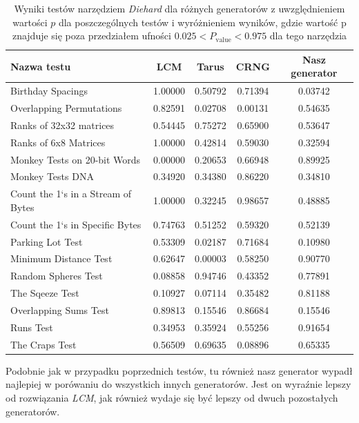 \begin{table}[!ht]
    \centering
    \begin{tabular}{|l|c|c|c|c|}
    \hline
        \textbf{Nazwa testu} & \textbf{LCM} & \textbf{Tarus} & \textbf{CRNG} & \textbf{Nasz generator} \\ \hline
        Birthday Spacings & \cellcolor{lred}1.00000 & 0.50792 & 0.71394 & 0.03742 \\ \hline
        Overlapping Permutations & 0.82591 & 0.02708 & \cellcolor{lred}0.00131 & 0.54635 \\ \hline
        Ranks of 32x32 matrices & 0.54445 & 0.75272 & 0.65900 & 0.53647 \\ \hline
        Ranks of 6x8 Matrices & \cellcolor{lred}1.00000 & 0.42814 & 0.59030 & 0.32594 \\ \hline
        Monkey Tests on 20-bit Words & \cellcolor{lred}0.00000 & 0.20653 & 0.66948 & 0.89925 \\ \hline
        Monkey Tests DNA & 0.34920 & 0.34380 & 0.86220 & 0.34810 \\ \hline
        Count the 1`s in a Stream of Bytes & \cellcolor{lred}1.00000 & 0.32245 & \cellcolor{lred}0.98657 & 0.48885 \\ \hline
        Count the 1`s in Specific Bytes & 0.74763 & 0.51252 & 0.59320 & 0.52139 \\ \hline
        Parking Lot Test & 0.53309 & \cellcolor{lred}0.02187 & 0.71684 & 0.10980 \\ \hline
        Minimum Distance Test & 0.62647 & \cellcolor{lred}0.00003 & 0.58250 & 0.90770 \\ \hline
        Random Spheres Test & 0.08858 & 0.94746 & 0.43352 & 0.77891 \\ \hline
        The Sqeeze Test & 0.10927 & 0.07114 & 0.35482 & 0.81188 \\ \hline
        Overlapping Sums Test & 0.89813 & 0.15546 & 0.86684 & 0.15546 \\ \hline
        Runs Test & 0.34953 & 0.35924 & 0.55256 & 0.91654 \\ \hline
        The Craps Test & 0.56509 & 0.69635 & 0.08896 & 0.65335 \\ \hline
    \end{tabular}
    \caption{\label{tab:diehard} Wyniki testów narzędziem \emph{Diehard} \cite{Diehard} dla różnych generatorów z uwzględnieniem wartości $p$ dla poszczególnych testów i wyróżnieniem wyników, gdzie wartość p znajduje się poza przedziałem ufności $0.025 < P_\textrm{value} < 0.975$ dla tego narzędzia}
\end{table}
Podobnie jak w przypadku poprzednich testów, tu również nasz generator wypadł najlepiej w porówaniu do wszystkich innych generatorów. Jest on wyraźnie lepszy od rozwiązania \emph{LCM}, jak również wydaje się być lepszy od dwuch pozostałych generatorów.
